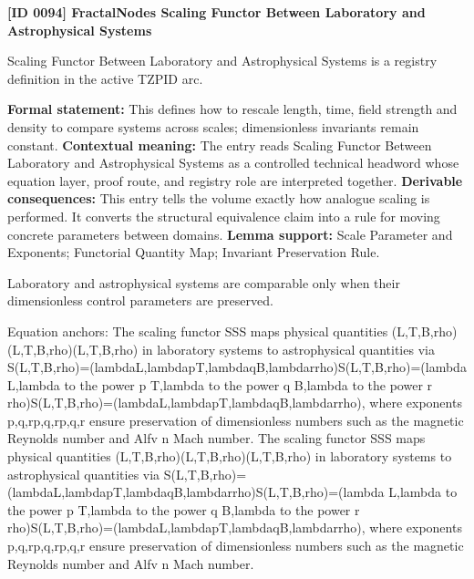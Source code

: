 \clearpage
\noindent\textbf{[ID 0094] FractalNodes Scaling Functor Between Laboratory and Astrophysical Systems}\par
\vspace{0.35em}
\begingroup\small
{}
Scaling Functor Between Laboratory and Astrophysical Systems is a registry definition in the active TZPID arc.

\begingroup\footnotesize\setlength{\emergencystretch}{3em}\sloppy
\textbf{Formal statement:} This defines how to rescale length, time, field strength and density to compare systems across scales; dimensionless invariants remain constant. \textbf{Contextual meaning:} The entry reads Scaling Functor Between Laboratory and Astrophysical Systems as a controlled technical headword whose equation layer, proof route, and registry role are interpreted together. \textbf{Derivable consequences:} This entry tells the volume exactly how analogue scaling is performed. It converts the structural equivalence claim into a rule for moving concrete parameters between domains. \textbf{Lemma support:} Scale Parameter and Exponents; Functorial Quantity Map; Invariant Preservation Rule.\par
\endgroup

Laboratory and astrophysical systems are comparable only when their dimensionless control parameters are preserved.

Equation anchors: The scaling functor SSS maps physical quantities (L,T,B,rho)(L,T,B,rho)(L,T,B,rho) in laboratory systems to astrophysical quantities via S(L,T,B,rho)=(lambdaL,lambdapT,lambdaqB,lambdarrho)S(L,T,B,rho)=(lambda L,lambda to the power p T,lambda to the power q B,lambda to the power r rho)S(L,T,B,rho)=(lambdaL,lambdapT,lambdaqB,lambdarrho), where exponents p,q,rp,q,rp,q,r ensure preservation of dimensionless numbers such as the magnetic Reynolds number and Alfv n Mach number. The scaling functor SSS maps physical quantities (L,T,B,rho)(L,T,B,rho)(L,T,B,rho) in laboratory systems to astrophysical quantities via S(L,T,B,rho)=(lambdaL,lambdapT,lambdaqB,lambdarrho)S(L,T,B,rho)=(lambda L,lambda to the power p T,lambda to the power q B,lambda to the power r rho)S(L,T,B,rho)=(lambdaL,lambdapT,lambdaqB,lambdarrho), where exponents p,q,rp,q,rp,q,r ensure preservation of dimensionless numbers such as the magnetic Reynolds number and Alfv n Mach number.


